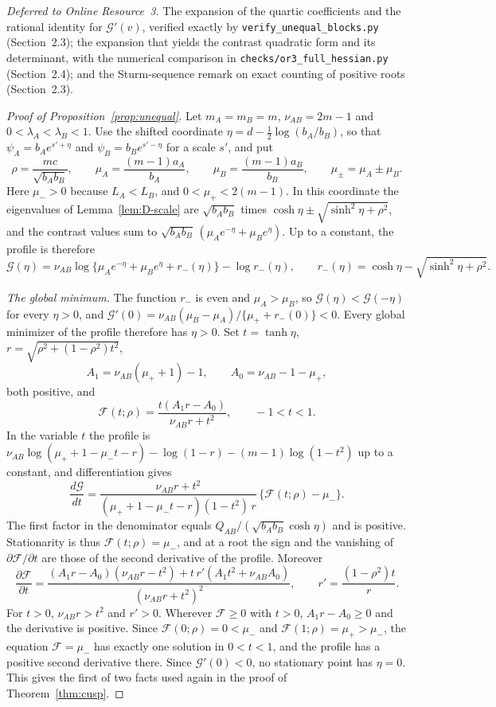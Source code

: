 \textit{Deferred to Online Resource~3.} The expansion of the quartic coefficients and the rational identity for $\mathcal G'(v)$, verified exactly by \texttt{verify\_unequal\_blocks.py} (Section~2.3); the expansion that yields the contrast quadratic form and its determinant, with the numerical comparison in \texttt{checks/or3\_full\_hessian.py} (Section~2.4); and the Sturm-sequence remark on exact counting of positive roots (Section~2.3).

\begin{proof}[Proof of Proposition~\ref{prop:unequal}]
Let $m_A=m_B=m$, $\nu_{AB}=2m-1$ and $0<\lambda_A<\lambda_B<1$. Use the shifted coordinate $\eta=d-\tfrac12\log(b_A/b_B)$, so that $\psi_A=b_Ae^{s'+\eta}$ and $\psi_B=b_Be^{s'-\eta}$ for a scale $s'$, and put
\[
\rho=\frac{mc}{\sqrt{b_Ab_B}},\qquad
\mu_A=\frac{(m-1)a_A}{b_A},\qquad \mu_B=\frac{(m-1)a_B}{b_B},\qquad
\mu_\pm=\mu_A\pm\mu_B .
\]
Here $\mu_->0$ because $L_A<L_B$, and $0<\mu_+<2(m-1)$. In this coordinate the eigenvalues of Lemma~\ref{lem:D-scale} are $\sqrt{b_Ab_B}$ times $\cosh\eta\pm\sqrt{\sinh^2\eta+\rho^2}$, and the contrast values sum to $\sqrt{b_Ab_B}\,(\mu_Ae^{-\eta}+\mu_Be^{\eta})$. Up to a constant, the profile is therefore
\[
\mathcal G(\eta)=\nu_{AB}\log\{\mu_Ae^{-\eta}+\mu_Be^{\eta}+r_-(\eta)\}-\log r_-(\eta),
\qquad r_-(\eta)=\cosh\eta-\sqrt{\sinh^2\eta+\rho^2}.
\]

\textit{The global minimum.} The function $r_-$ is even and $\mu_A>\mu_B$, so $\mathcal G(\eta)<\mathcal G(-\eta)$ for every $\eta>0$, and $\mathcal G'(0)=\nu_{AB}(\mu_B-\mu_A)/\{\mu_++r_-(0)\}<0$. Every global minimizer of the profile therefore has $\eta>0$. Set $t=\tanh\eta$, $r=\sqrt{\rho^2+(1-\rho^2)t^2}$,
\[
A_1=\nu_{AB}(\mu_++1)-1,\qquad A_0=\nu_{AB}-1-\mu_+,
\]
both positive, and
\[
\mathcal F(t;\rho)=\frac{t(A_1r-A_0)}{\nu_{AB}r+t^2},\qquad -1<t<1 .
\]
In the variable $t$ the profile is $\nu_{AB}\log(\mu_++1-\mu_-t-r)-\log(1-r)-(m-1)\log(1-t^2)$ up to a constant, and differentiation gives
\[
\frac{d\mathcal G}{dt}=\frac{\nu_{AB}r+t^2}{(\mu_++1-\mu_-t-r)(1-t^2)\,r}\,\{\mathcal F(t;\rho)-\mu_-\}.
\]
The first factor in the denominator equals $Q_{AB}/(\sqrt{b_Ab_B}\cosh\eta)$ and is positive. Stationarity is thus $\mathcal F(t;\rho)=\mu_-$, and at a root the sign and the vanishing of $\partial\mathcal F/\partial t$ are those of the second derivative of the profile. Moreover
\[
\frac{\partial\mathcal F}{\partial t}
=\frac{(A_1r-A_0)(\nu_{AB}r-t^2)+t\,r'(A_1t^2+\nu_{AB}A_0)}{(\nu_{AB}r+t^2)^2},
\qquad r'=\frac{(1-\rho^2)t}{r} .
\]
For $t>0$, $\nu_{AB}r>t^2$ and $r'>0$. Wherever $\mathcal F\ge0$ with $t>0$, $A_1r-A_0\ge0$ and the derivative is positive. Since $\mathcal F(0;\rho)=0<\mu_-$ and $\mathcal F(1;\rho)=\mu_+>\mu_-$, the equation $\mathcal F=\mu_-$ has exactly one solution in $0<t<1$, and the profile has a positive second derivative there. Since $\mathcal G'(0)<0$, no stationary point has $\eta=0$. This gives the first of two facts used again in the proof of Theorem~\ref{thm:cusp}.


\end{proof}
